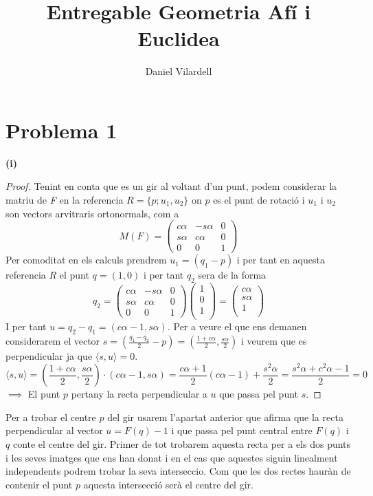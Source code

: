 \documentclass[12pt, a4papre]{article}
\author{Daniel Vilardell}
\title{Entregable Geometria Afí i Euclidea}
\date{}
\begin{document}
	\maketitle
	\section{Problema 1}
	\textbf{(i)} 
	\begin{proof}
		 Tenint en conta que es un gir al voltant d'un punt, podem considerar la matriu de \textit{F} en la referencia $R=\{p; u_1, u_2\}$ on 
		$p$ es el punt de rotació i $u_1$ i $u_2$ son vectors arvitraris ortonormals, com a
		\[
		M(F)= 
		\begin{pmatrix}
			c\alpha &	- s\alpha	& 0\\
			s\alpha  & c\alpha	& 0\\
			0    & 	0	& 1 
		\end{pmatrix}
		\]
		Per comoditat en els calculs prendrem $u_1=(q_1-p)$ i per tant en aquesta referencia $R$ el punt $q=(1,0)$ i per tant $q_2$ sera de la forma
		\[
		q_2=
		\begin{pmatrix}
			c\alpha &	- s\alpha	& 0\\
			s\alpha  & c\alpha	& 0\\
			0    & 	0	& 1 
		\end{pmatrix}
		\begin{pmatrix}
			1\\
			0 \\
			1 \\
		\end{pmatrix}
		=
		\begin{pmatrix}
			c\alpha\\
			s\alpha \\
			1 \\
		\end{pmatrix}
		\]
		I per tant $u=q_2-q_1=(c\alpha-1,s\alpha)$. Per a veure el que ens demanen considerarem el vector $s=(\frac{q_1-q_2}{2}-p)=(\frac{1+c\alpha}{2},\frac{s\alpha}{2})$ 
		i veurem que es perpendicular ja que $\langle s, u\rangle = 0$.
		\[
		\langle s, u\rangle = (\frac{1+c\alpha}{2},\frac{s\alpha}{2})\cdot(c\alpha-1,s\alpha)=
		\frac{c\alpha+1}{2}(c\alpha-1)+\frac{s^2\alpha}{2}=\frac{s^2\alpha+c^2\alpha-1}{2}=0
		\]
		$\implies$ El punt $p$ pertany la recta perpendicular a $u$ que passa pel punt $s$.
		
	\end{proof}
	\newpage
	Per a trobar el centre $p$ del gir usarem l'apartat anterior  que afirma que la recta perpendicular al vector $u=F(q)-1$ i que passa pel punt
	central entre $F(q)$ i $q$ conte el centre del gir. Primer de tot trobarem aquesta recta per a els dos punts i les seves imatges que ens han donat
	i en el cas que aquestes siguin linealment independents podrem trobar la seva interseccio. Com que les dos rectes hauràn de contenir el punt
	$p$ aquesta intersecció serà el centre del gir.
	
\end{document}
